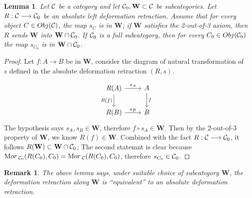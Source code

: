 \documentclass[11pt]{article}
\newtheorem{lemma}[thm]{Lemma}
\newtheorem{rmk}[thm]{Remark}
\newcommand{\mor}{{\text Mor\,}}
\newcommand{\calc}{{\cal C}}
\newcommand{\lrta}{\longrightarrow}
\begin{document}
\begin{lemma}\label{lem:criterior_of_deformation_retract}
Let $\calc$ be a category and let $\calc_0, \mathbf{W}\subset \calc$ be subcategories. Let $R:\calc\lrta \calc_0$ be an absolute left deformation retraction. Assume that for every object $C\in Obj(\calc)$, the map $s_C$ is in $\mathbf{W}$; if $\mathbf{W}$ satisfies the 2-out-of-3 axiom, then $R$ sends $\mathbf{W}$ into $\mathbf{W}\cap \calc_0$. If $\calc_0$ is a full subcategory, then for every $C_0\in Obj(\calc_0)$ the map $s_{C_0}$ is in $\mathbf{W}\cap \calc_0$.
\end{lemma}
\begin{proof}
Let $f: A\lrta B$ be in $\mathbf{W}$, consider the diagram of natural transformation of $s$ defined in the absolute deformation retraction $(R,s)$.

$$
\begin{tikzcd}
R(A) \arrow[d, "R(f)"'] \arrow[r, "s_A"] & A \arrow[d, "f"] \\
R(B) \arrow[r, "s_B"] & B
\end{tikzcd}
$$
The hypothesis says $s_A, s_B\in \mathbf{W}$, therefore $f\circ  s_A\in \mathbf{W}$. Then by the 2-out-of-3 property of $\mathbf{W}$, we know $R(f)\in\mathbf{W}$. Combined with the fact $R: \calc\lrta \calc_0$, it follows $R(\mathbf{W})\subset \mathbf{W}\cap \calc_0$; The second statemnt is clear because $\mor_{\calc_0}(R(C_0), C_0)=\mor_{\calc}(R(C_0),C_0)$, therefore $s_{C_0}\in \calc_0$.  
\end{proof}
\begin{rmk}
The above lemma says, under suitable choice of subcategory $\mathbf{W}$, the deformation retraction along $\mathbf{W}$ is ``equivalent'' to an absolute deformation retraction. 
\end{rmk}
 
\end{document}
